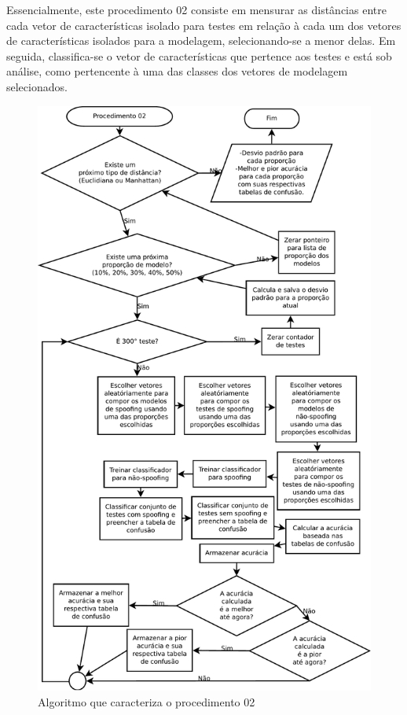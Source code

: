 		\par Essencialmente, este procedimento 02 consiste em mensurar as distâncias entre cada vetor de características isolado para testes em relação à cada um dos vetores de características isolados para a modelagem, selecionando-se a menor delas. Em seguida, classifica-se o vetor de características que pertence aos testes e está sob análise, como pertencente à uma das classes dos vetores de modelagem selecionados.   
		
		\begin{figure}[H]
			\centering
			\includegraphics[width=.9\linewidth]{images/AlgoProcedure02}
			\caption{Algoritmo que caracteriza o procedimento 02}
			\label{fig:experiment02Algo}
		\end{figure}
		
